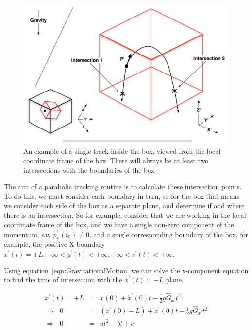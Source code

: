\documentclass[11pt,a4paper,oneside]{article}
\begin{document}
\begin{figure}[!htbp] 
\begin{center}
\includegraphics[scale=0.4]{designdocumentimages/fig2-IntersectionWithBox}
\end{center}
\caption{An example of a single track inside the box, viewed from the local coordinate frame of the box. There will always be at least two intersections with the boundaries of the box}
\label{fig:IntersectionWithBox}
\end{figure}

The aim of a parabolic tracking routine is to calculate these intersection points. To do this, we must consider each boundary in turn, so for the box that means we consider each side of the box as a separate plane, and determine if and where there is an intersection. So for example, consider that we are working in the local coordinate frame of the box, and we have a single non-zero component of the momentum, say $p^{\prime}_{x}(t_{0}) \neq 0$, and a single corresponding boundary of the box, for example, the positive-X boundary $x^{\prime}(t) = +L, -\infty < y^{\prime}(t) < +\infty, -\infty < z^{\prime}(t) < +\infty$.

Using equation~\ref{eqn:GravitationalMotion} we can solve the x-component equation to find the time of intersection with the $x^{\prime}(t) = +L$ plane. 

\begin{eqnarray}
x^{\prime}(t) = +L &=& x(0) + \dot{x}^{\prime}(0)t + \frac{1}{2}g\hat{G}_{x^{\prime}}t^{2} \\
\Rightarrow \ \ \	 0 &=& (x^{\prime}(0) - L) + \dot{x}^{\prime}(0)t + \frac{1}{2}g\hat{G}_{x^{\prime}}t^{2} \\
\Rightarrow \ \ \	 0 &=& at^{2} + bt + c
\label{eqn:SolveForBoundaryIntersection}
\end{eqnarray}
\end{document}
